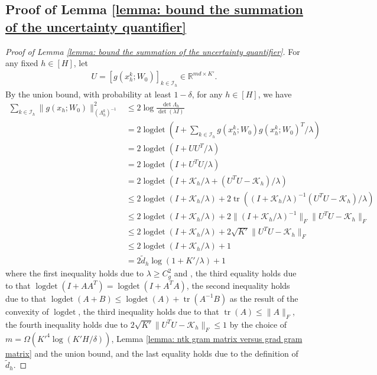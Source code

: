\documentclass{article} \usepackage{iclr2023/iclr2023_conference,times}
\DeclareMathOperator*{\logdet}{logdet}
\DeclareMathOperator*{\tr}{tr}
\begin{document}
\subsection{Proof of Lemma \ref{lemma: bound the summation of the uncertainty quantifier}}

\begin{proof}[Proof of Lemma \ref{lemma: bound the summation of the uncertainty quantifier}]
For any fixed $h \in [H]$, let  
\begin{align*}
    U = [g(x^k_h; W_0)]_{k \in \mathcal{I}_h} \in \mathbb{R}^{md \times K'}. 
\end{align*}
By the union bound, with probability at least $1 - \delta$, for any $h \in [H]$, we have 
\begin{align*}
    \sum_{k \in \mathcal{I}_h} \| g(x_h; W_0)  \|_{(\Lambda^k_h)^{-1}}^2 &\leq 2 \log \frac{\det \Lambda_h}{\det (\lambda I)} \\
    &= 2 \logdet \left(I + \sum_{k \in \mathcal{I}_h} g(x^k_h; W_0) g(x^k_h; W_0)^T / \lambda \right) \\ 
    &= 2 \logdet(I + U U^T /\lambda) \\ 
    &= 2 \logdet(I + U^T U /\lambda) \\
    &= 2 \logdet(I + \mathcal{K}_h/ \lambda + (U^T U - \mathcal{K}_h)/ \lambda) \\ 
    &\leq 2 \logdet(I + \mathcal{K}_h/ \lambda) + 2 \tr\left( (I + \mathcal{K}_h/ \lambda)^{-1} (U^T U - \mathcal{K}_h)/ \lambda \right) \\ 
    &\leq 2 \logdet(I + \mathcal{K}_h/ \lambda) + 2  \| (I + \mathcal{K}_h/ \lambda)^{-1} \|_F \| U^T U - \mathcal{K}_h \|_F \\ 
    &\leq 2 \logdet(I + \mathcal{K}_h/ \lambda) + 2 \sqrt{K'} \| U^T U - \mathcal{K}_h \|_F \\ 
    &\leq 2 \logdet(I + \mathcal{K}_h/ \lambda) + 1 \\ 
    &= 2\tilde{d}_h \log(1 + K' / \lambda) + 1
\end{align*}
where the first inequality holds due to $\lambda \geq C_g^2$ and \cite[Lemma~11]{NIPS2011_e1d5be1c}, the third equality holds due to that $\logdet(I + AA^T) = \logdet(I + A^TA)$, the second inequality holds due to that $\logdet(A + B) \leq \logdet(A) + \tr(A^{-1} B)$ as the result of the convexity of $\logdet$, the third inequality holds due to that $\tr(A) \leq  \| A \|_F$, the fourth inequality holds due to $2 \sqrt{K'} \| U^T U - \mathcal{K}_h \|_F \leq 1$ by the choice of $m = \Omega(K'^4 \log (K'H /\delta))$, Lemma \ref{lemma: ntk gram matrix versus grad gram matrix} and the union bound, and the last equality holds due to the definition of $\tilde{d}_h$. 
\end{proof}
\end{document}
